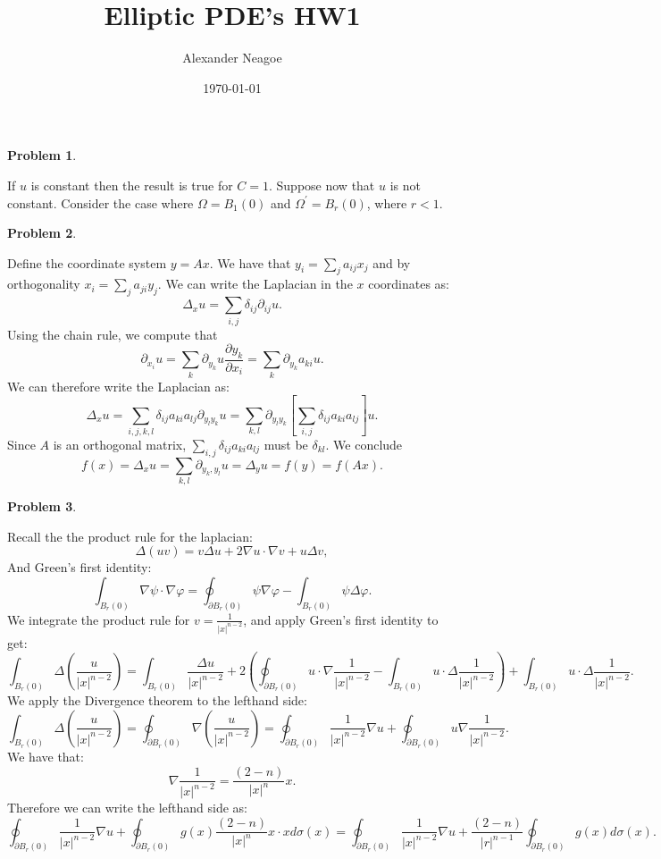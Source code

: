 \documentclass[12pt, a4paper]{article}
\title{Elliptic PDE's HW1}
\author{Alexander Neagoe }
\date{\today}
\newtheorem{problem}{Problem}
\theoremstyle{definition}
\newcommand{\bd}{\partial}
\newcommand{\grad}{\nabla}
\begin{document}
\maketitle

\begin{problem}
\end{problem}
If $u$ is constant then the result is true for $C=1$. Suppose now that $u$ is not constant. Consider the case where $\Omega  = B_1(0)$ and $\Omega^\prime = B_r(0)$, where $r<1$.  
\newpage
\begin{problem}
\end{problem}
Define the coordinate system $y = Ax$. We have that $y_i = \sum_j a_{ij}x_j$ and by orthogonality $x_i = \sum_{j} a_{ji}y_j$. We can write the Laplacian in the $x$ coordinates as: 
$$\Delta_x u = \sum_{i ,j} \delta_{ij} \partial_{ij}u.$$
Using the chain rule, we compute that 
$$\partial_{x_i} u = \sum_k \partial_{y_k}u \frac{\partial y_k}{\partial x_i} = \sum_k \partial_{y_k} a_{ki}u.$$
We can therefore write the Laplacian as: 
$$\Delta_x u = \sum_{i,j,k , l} \delta_{ij} a_{ki}a_{lj} \partial_{y_l y_k} u = \sum_{k, l} \partial_{y_l y_k} \left[ \sum_{i,j}\delta_{ij} a_{ki}a_{lj} \right]u.$$
Since $A$ is an orthogonal matrix, $\sum_{i,j}\delta_{ij} a_{ki}a_{lj}$ must be $\delta_{kl}.$
We conclude
$$f(x) = \Delta_x u = \sum_{k,l} \partial_{y_k,y_l}u = \Delta_y u = f(y) = f(Ax).$$
\newpage
\begin{problem}
\end{problem}
Recall the the product rule for the laplacian: 
$$\Delta(uv) = v \Delta u + 2\grad u \cdot \grad v + u \Delta v,$$
And Green's first identity:
$$\int_{B_r(0)} \grad \psi \cdot \grad \varphi = \oint_{\bd B_r(0)} \psi \grad \varphi - \int_{B_r(0)} \psi \Delta \varphi.$$
We integrate the product rule for $v= \frac{1}{|x|^{n-2}}$, and apply Green's first identity to get:
$$\int_{B_r(0)}\Delta \left( \frac{u}{|x|^{n-2}} \right) = \int_{B_r(0)} \frac{\Delta u}{|x|^{n-2}}  + 2 \left( \oint_{\bd B_r(0)} u \cdot \grad \frac{1}{|x|^{n-2}} - \int_{B_r(0)}u \cdot \Delta \frac{1}{|x|^{n-2}}\right) + \int_{B_r(0)} u \cdot \Delta \frac{1}{|x|^{n-2}}.$$
We apply the Divergence theorem to the lefthand side: 
$$\int_{B_r(0)}\Delta \left( \frac{u}{|x|^{n-2}} \right) = \oint_{\bd B_r(0)} \grad\left(\frac{u}{|x|^{n-2}}\right) = \oint_{\bd B_r(0)} \frac{1}{|x|^{n-2}} \grad u + \oint_{\bd B_r(0)}u \grad \frac{1}{|x|^{n-2}}.$$
We have that:
$$\grad \frac{1}{|x|^{n-2}} = \frac{(2-n)}{|x|^{n}} x.$$
Therefore we can write the lefthand side as: 
$$\oint_{\bd B_r(0)} \frac{1}{|x|^{n-2}} \grad u  + \oint_{\bd B_r(0)} g(x) \frac{(2-n)}{|x|^n}x \cdot x d\sigma(x) =\oint_{\bd B_r(0)}\frac{1}{|x|^{n-2}} \grad u + \frac{(2-n)}{|r|^{n-1}} \oint_{\bd B_r(0)} g(x) d\sigma(x).$$
\end{document}
